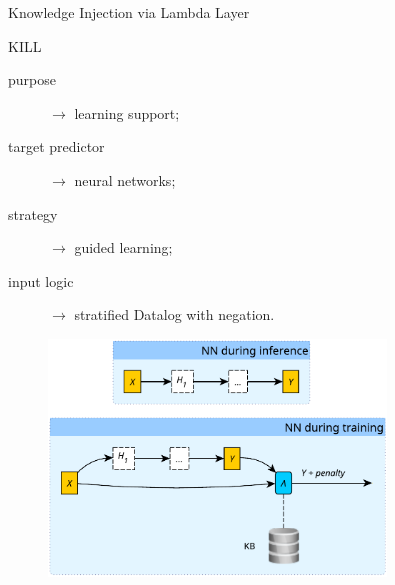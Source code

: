 \documentclass[presentation]{beamer}\mode<presentation>{\usetheme{AMSBolognaFC}}
\begin{document}
\begin{frame}[allowframebreaks]{Knowledge Injection via Lambda Layer}
    \begin{block}{KILL}
        \begin{description}
            \item[purpose] $\rightarrow$ learning support;
            \item[target predictor] $\rightarrow$ neural networks;
            \item[strategy] $\rightarrow$ guided learning;
            \item[input logic] $\rightarrow$ stratified Datalog with negation.
        \end{description}        
    \end{block}

    \framebreak
    
    \begin{figure}
        \centering
        \includegraphics[width=0.8\textwidth]{figures/kill-architecture}
    \end{figure}

    \framebreak
    
    
\end{frame}

\section{\psyki}
\end{document}
